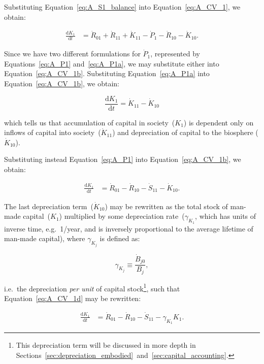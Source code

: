 Substituting Equation~\ref{eq:A_S1_balance} 
into Equation~\ref{eq:A_CV_1}, we obtain:

\begin{align}\label{eq:A_CV_1b}
	\frac{\mathrm{d}K_{1}}{\mathrm{d}t}		&
	= \dot{R}_{01} 
	+ \dot{R}_{11}
	+ \dot{K}_{11}
	- \dot{P}_{1}				
	- \dot{R}_{10}				
	- \dot{K}_{10}.
\end{align}

Since we have two different formulations for $\dot{P}_{1}$,
represented by Equations~\ref{eq:A_P1} and~\ref{eq:A_P1a}, 
we may substitute either into Equation~\ref{eq:A_CV_1b}.
Substituting Equation~\ref{eq:A_P1a} 
into Equation~\ref{eq:A_CV_1b}, we obtain:

\begin{equation}\label{eq:A_CV_1c}
	\frac{\mathrm{d}K_{1}}{\mathrm{d}t}		
	= \dot{K}_{11}
	- \dot{K}_{10}
\end{equation}

\noindent{}which tells us that 
accumulation of capital in society~($K_{1}$)
is dependent only on 
inflows of capital into society~($\dot{K}_{11}$) 
and depreciation of capital 
to the biosphere ($\dot{K}_{10}$).

Substituting instead Equation~\ref{eq:A_P1} 
into Equation~\ref{eq:A_CV_1b}, we obtain:

 \begin{align}\label{eq:A_CV_1d}
	\frac{\mathrm{d}K_{1}}{\mathrm{d}t}		&
	= \dot{R}_{01} 
	- \dot{R}_{10}
	- \dot{S}_{11}
	- \dot{K}_{10}.
\end{align}

The last depreciation term~($\dot{K}_{10}$)
may be rewritten as the total stock
of man-made capital~($K_{1}$) 
multiplied by some depreciation rate~($\gamma_{K_{1}}$,
which has units of inverse time, e.g.\ 1/year,
and is inversely proportional to the average lifetime
of man-made capital),
where $\gamma_{K_{j}}$ is defined as:

\begin{equation}\label{eq:def_gamma}
\gamma_{K_{j}} \equiv \frac{\dot{B}_{j0}}{B_{j}},
\end{equation}

\noindent{}i.e.\ the depreciation 
\emph{per unit} of capital stock\footnote{This
depreciation term will be discussed in more depth in
Sections~\ref{sec:depreciation_embodied}~and~\ref{sec:capital_accounting}.
},
such that Equation~\ref{eq:A_CV_1d} may be rewritten:

 \begin{align}\label{eq:A_CV_1e}
	\frac{\mathrm{d}K_{1}}{\mathrm{d}t}		&
	= \dot{R}_{01} 
	- \dot{R}_{10}
	- \dot{S}_{11}
	- \gamma_{K_{1}}{K}_{1}.
\end{align}

